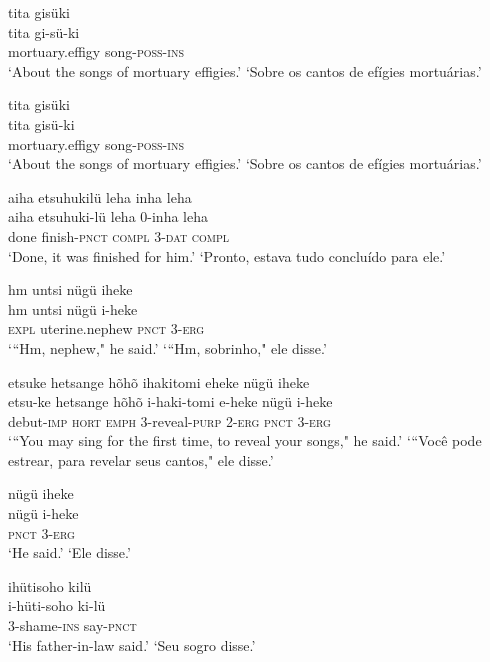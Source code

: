 \documentclass[output=paper,
modfonts,nonflat
]{langsci/langscibook}
\begin{document}
\ea  tita gisüki\\[.3em]
\gll tita gi-sü-ki\\
     mortuary.effigy song-\textsc{poss}-\textsc{ins}\\
\glt ‘About the songs of mortuary effigies.’
\glt ‘Sobre os cantos de efígies mortuárias.’
\z

\ea  tita gisüki\\[.3em]
\gll tita gisü-ki\\
     mortuary.effigy song-\textsc{poss}-\textsc{ins}\\
\glt ‘About the songs of mortuary effigies.’
\glt ‘Sobre os cantos de efígies mortuárias.’
\z

\ea  aiha etsuhukilü leha inha leha\\[.3em]
\gll aiha etsuhuki-lü leha 0-inha leha\\
     done finish-\textsc{pnct} \textsc{compl} 3-\textsc{dat} \textsc{compl}\\
\glt ‘Done, it was finished for him.’
\glt ‘Pronto, estava tudo concluído para ele.’
\z

\ea  hm untsi nügü iheke\\[.3em]
\gll hm untsi nügü i-heke\\
     \textsc{expl} uterine.nephew \textsc{pnct} 3-\textsc{erg}\\
\glt ‘“Hm, nephew," he said.’
\glt ‘“Hm, sobrinho," ele disse.’
\z

\ea  etsuke hetsange hõhõ ihakitomi eheke nügü iheke\\[.3em]
\gll etsu-ke hetsange hõhõ i-haki-tomi e-heke nügü i-heke\\
     debut-\textsc{imp} \textsc{hort} \textsc{emph} 3-reveal-\textsc{purp} 2-\textsc{erg} \textsc{pnct} 3-\textsc{erg}\\
\glt ‘“You may sing for the first time, to reveal your songs," he said.’
\glt ‘“Você pode estrear, para revelar seus cantos," ele disse.’
\z

\ea  nügü iheke\\[.3em]
\gll nügü i-heke\\
     \textsc{pnct} 3-\textsc{erg}\\
\glt ‘He said.’
\glt ‘Ele disse.’
\z

\ea  ihütisoho kilü\\[.3em]
\gll i-hüti-soho ki-lü\\
     3-shame-\textsc{ins} say-\textsc{pnct}\\
\glt ‘His father-in-law said.’
\glt ‘Seu sogro disse.’
\z
\end{document}
